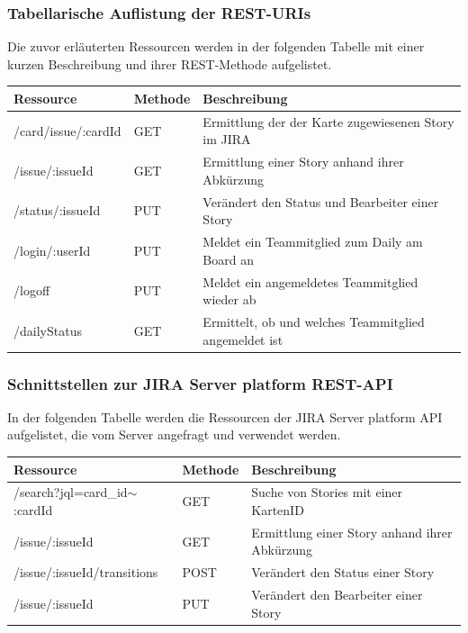 \documentclass[12pt,titlepage]{scrartcl}
\begin{document}
			\subsubsection{Tabellarische Auflistung der REST-URIs}
			Die zuvor erläuterten Ressourcen werden in der folgenden Tabelle mit einer kurzen Beschreibung und ihrer REST-Methode aufgelistet. 
			\begin{table}[H]
\begin{tabular}{|l|l|l|}
\hline
\textbf{Ressource}  & \textbf{Methode} & \textbf{Beschreibung}                                 \\ \hline
/card/issue/:cardId & GET              & Ermittlung der der Karte zugewiesenen Story im JIRA   \\ \hline
/issue/:issueId       & GET              & Ermittlung einer Story anhand ihrer Abkürzung         \\ \hline
/status/:issueId      & PUT              & Verändert den Status und Bearbeiter einer Story       \\ \hline
/login/:userId      & PUT              & Meldet ein Teammitglied zum Daily am Board an         \\ \hline
/logoff             & PUT              & Meldet ein angemeldetes Teammitglied wieder ab         \\ \hline
/dailyStatus        & GET              & Ermittelt, ob und welches Teammitglied angemeldet ist \\ \hline
\end{tabular}
\end{table}
			\subsubsection{Schnittstellen zur JIRA Server platform REST-API}
			In der folgenden Tabelle werden die Ressourcen der JIRA Server platform API aufgelistet, die vom Server angefragt und verwendet werden.
			\begin{table}[H]
\begin{tabular}{|l|l|l|}
\hline
\textbf{Ressource}                & \textbf{Methode} & \textbf{Beschreibung}                         \\ \hline
/search?jql=card\_id$\sim$:cardId & GET              & Suche von Stories mit einer KartenID          \\ \hline
/issue/:issueId                   & GET              & Ermittlung einer Story anhand ihrer Abkürzung \\ \hline
/issue/:issueId/transitions       & POST             & Verändert den Status einer Story              \\ \hline
/issue/:issueId                   & PUT              & Verändert den Bearbeiter einer Story          \\ \hline
\end{tabular}
\end{table}
			\newpage
\end{document}
